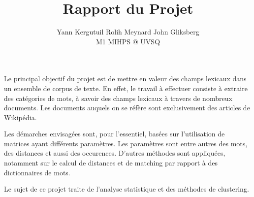 \documentclass[a4paper,11pt]{article}
\title{\bf Rapport du Projet}
\author{ Yann  Kergutuil \quad
         Rolih Meynard   \quad
         John  Gliksberg \quad \\
         M1 MIHPS @ UVSQ }
\date{}
\theoremstyle{definition}
\begin{document}
\maketitle

\tableofcontents

\pagebreak

Le principal objectif du projet est de mettre en valeur
des champs lexicaux dans un ensemble de corpus de texte.
En effet, le travail à effectuer consiste à extraire des
catégories de mots, à savoir des champs lexicaux à travers
de nombreux documents.
Les documents auquels on se réfère sont exclusivement des
articles de Wikipédia.

Les démarches envisagées sont, pour l'essentiel, basées sur
l'utilisation de matrices ayant différents paramètres.
Les paramètres sont entre autres des mots, des distances et
aussi des occurences. D'autres méthodes sont appliquées,
notamment sur le calcul de distances et de matching par rapport
à des dictionnaires de mots.

Le sujet de ce projet traite de l'analyse statistique
et des méthodes de clustering.



\pagebreak


\pagebreak


\pagebreak


\pagebreak

\end{document}
